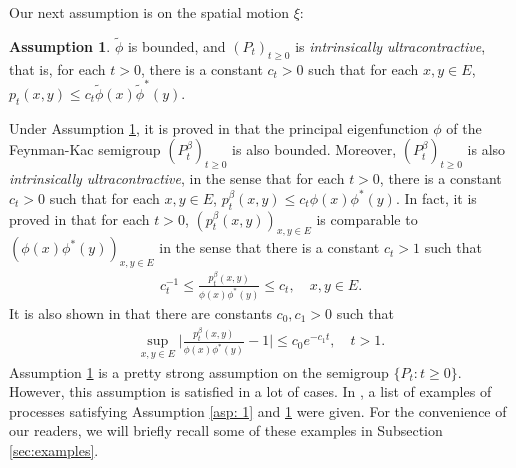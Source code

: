 \documentclass[12pt,a4paper]{amsart}
\theoremstyle{definition}
\newtheorem{asp}{Assumption}
\numberwithin{equation}{section}
\begin{document}
Our next assumption is on the spatial motion $\xi$:

\begin{asp} \label{asp: 3}
	$\widetilde \phi$ is bounded, and $(P_t)_{t\geq 0}$ is \emph{intrinsically ultracontractive}, that is, for each $t>0$, there is a constant $c_t >0$ such that for each $x,y\in E$, $p_t(x,y) \leq c_t \widetilde \phi(x) \widetilde \phi^*(y)$.
\end{asp}
	
Under Assumption \ref{asp: 3}, it is proved in \cite{RenSongZhang2015Limit, RenSongZhang2017Central} that the principal eigenfunction $\phi$ of the Feynman-Kac semigroup $(P^\beta_t)_{t\geq 0}$ is also bounded.
Moreover, $(P^\beta_t)_{t\geq 0}$ is also \emph{intrinsically ultracontractive}, in the sense that for each $t>0$, there is a constant $c_t >0$ such that for each $x,y\in E$, $p^\beta_t(x,y) \leq c_t \phi(x) \phi^*(y)$.
In fact, it is proved in \cite{KimSong2008Intrinsic} that for each $t>0$, $(p^\beta_t(x,y))_{x,y\in E}$ is comparable to $(\phi(x)\phi^*(y))_{x,y\in E}$ in the sense that there is a constant $c_t > 1$ such that
\begin{align}\label{eq: p-t-beta is comparable to phi phi-star}
	c_t^{-1}
	\leq \frac {p^\beta_t(x,y)} {\phi(x)\phi^*(y)}
	\leq c_t,
	\quad x,y \in E.
\end{align}
It is also shown in \cite{KimSong2008Intrinsic} that there are constants $c_0, c_1 > 0$ such that
\begin{align}\label{eq:q(t,x,y)}
	\sup_{x,y\in E} \Big|\frac{p^\beta_t(x,y)}{\phi(x)\phi^*(y)} - 1 \Big|
	\leq c_0 e^{-c_1 t},
	\quad t > 1.
\end{align}
Assumption \ref{asp: 3} is a pretty strong assumption on the semigroup $\{P_t : t \ge 0\}$. However, this assumption is satisfied in a lot of cases.  
In \cite{RenSongZhang2015Limit},  a list of examples of processes satisfying Assumption \ref{asp: 1} and \ref{asp: 3} were given. 
For the convenience of our readers, we will
briefly recall some of these examples in Subsection \ref{sec:examples}.
\end{document}
